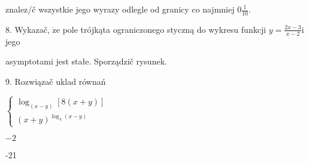\documentclass[a4paper,12pt]{article}
\begin{document}
znalez/č wszystkie jego wyrazy odlegle od granicy co najmniej $0\displaystyle \frac{1}{10}.$

8. Wykazač, $\dot{\mathrm{z}}\mathrm{e}$ pole trójkąta ograniczonego styczną do wykresu funkcji $y = \displaystyle \frac{2x-3}{x-2} \mathrm{i}$ jego

asymptotami jest stałe. Sporządzič rysunek.

9. Rozwiązač uklad równań

$\left\{\begin{array}{l}
\log_{(x-y)}[8(x+y)]\\
(x+y)^{\log_{4}(x-y)}
\end{array}\right.$

$-2$

-21
\end{document}
